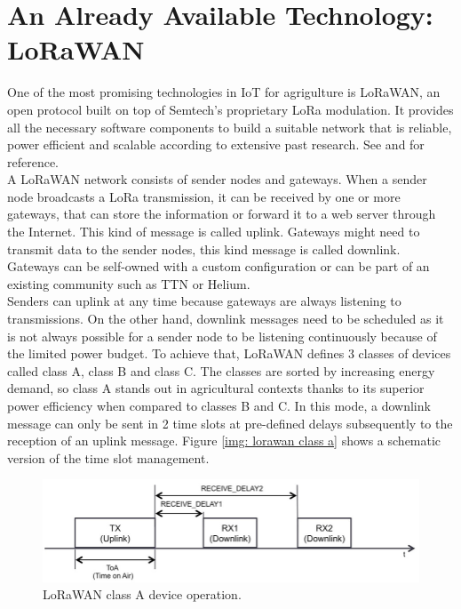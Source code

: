 \section{An Already Available Technology: LoRaWAN}
One of the most promising technologies in \gls{IoT} for agrigulture is \gls{LoRaWAN}, an open protocol built on top of
Semtech's proprietary LoRa modulation. It provides all the necessary software components to build a suitable network
that is reliable, power efficient and scalable according to extensive past research. See \cite{lorawan_agriculture_1}
and \cite{lorawan_agriculture_2} for reference.\\
A LoRaWAN network consists of sender nodes and gateways. When a sender node broadcasts a LoRa transmission, it can be
received by one or more gateways, that can store the information or forward it to a web server through the Internet.
This kind of message is called uplink. Gateways might need to transmit data to the sender nodes, this kind message is
called downlink. Gateways can be self-owned with a custom configuration or can be part of an existing community such as
\gls{TTN} or Helium.\\
Senders can uplink at any time because gateways are always listening to transmissions. On the other hand, downlink
messages need to be scheduled as it is not always possible for a sender node to be listening continuously because of
the limited power budget. To achieve that, LoRaWAN defines 3 classes of devices called class A, class B and class C.
The classes are sorted by increasing energy demand, so class A stands out in agricultural
contexts thanks to its superior power efficiency when compared to classes B and C. In this mode, a downlink message can
only be sent in 2 time slots at pre-defined delays subsequently to the reception of an uplink message. Figure \ref{img:
lorawan class a} shows a schematic version of the time slot management.

\begin{figure}[ht]
    \centering
    \includegraphics[width=\linewidth]{images/lorawan_class_a.png}
    \caption{LoRaWAN class A device operation.}
    \label{img: lorawan class a}
\end{figure}


